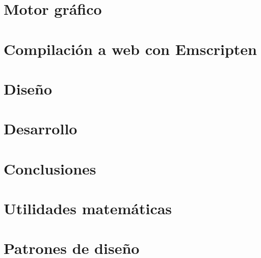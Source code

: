 \documentclass{report}
\begin{document}
\cleardoublepage
\chapter{Motor gráfico}


\cleardoublepage
\chapter{Compilación a web con Emscripten}


\cleardoublepage
\chapter{Diseño}


\cleardoublepage
\chapter{Desarrollo}


\cleardoublepage
\chapter{Conclusiones}

\cleardoublepage
\appendix
\chapter{Utilidades matemáticas}


\chapter{Patrones de diseño}


%
%
\printbibliography
\end{document}

